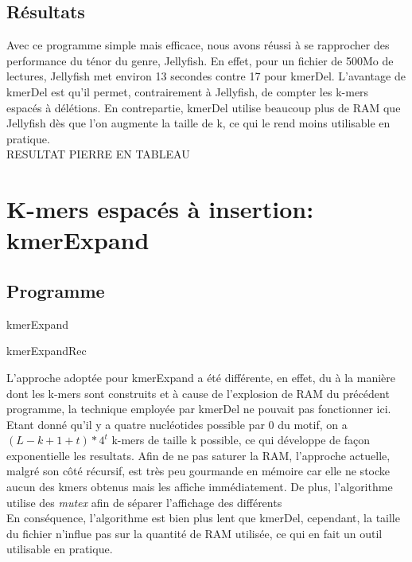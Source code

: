 \documentclass{report}
\begin{document}
    \section{Résultats}
      Avec ce programme simple mais efficace, nous avons réussi à se rapprocher des performance du ténor du genre, Jellyfish. En effet, pour un fichier de 500Mo de lectures, Jellyfish met environ 13 secondes contre 17 pour kmerDel. L'avantage de kmerDel est qu'il permet, contrairement à Jellyfish, de compter les k-mers espacés à délétions. En contrepartie, kmerDel utilise beaucoup plus de RAM que Jellyfish dès que l'on augmente la taille de k, ce qui le rend moins utilisable en pratique.\\

      RESULTAT PIERRE EN TABLEAU
    \newpage
  \chapter{K-mers espacés à insertion: kmerExpand}
    \section{Programme}
      \begin{algorithm}[H]{
        \caption{kmerExpand}
      }\end{algorithm}
      \begin{algorithm}[H]{
        \caption{kmerExpandRec}
      }\end{algorithm}
      L'approche adoptée pour kmerExpand a été différente, en effet, du à la manière dont les k-mers sont construits et à cause de l'explosion de RAM du précédent programme, la technique employée par kmerDel ne pouvait pas fonctionner ici.\\
      Etant donné qu'il y a quatre nucléotides possible par $0$ du motif, on a $(L - k + 1 + t)*4^t$ k-mers de taille k possible, ce qui développe de façon exponentielle les resultats. Afin de ne pas saturer la RAM, l'approche actuelle, malgré son côté récursif, est très peu gourmande en mémoire car elle ne stocke aucun des kmers obtenus mais les affiche immédiatement. De plus, l'algorithme utilise des \textit{mutex} afin de séparer l'affichage des différents \\
      En conséquence, l'algorithme est bien plus lent que kmerDel, cependant, la taille du fichier n'influe pas sur la quantité de RAM utilisée, ce qui en fait un outil utilisable en pratique.
\end{document}
